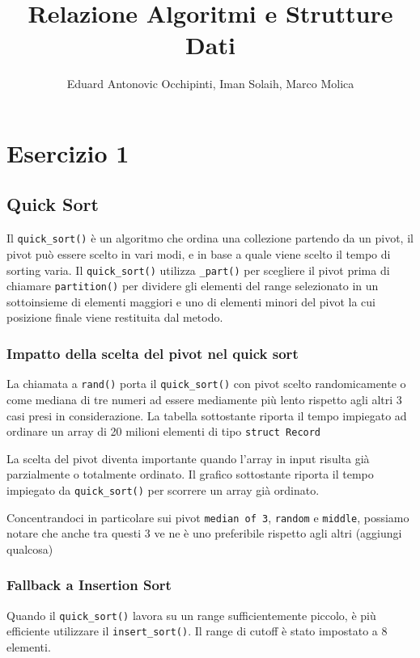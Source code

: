 \documentclass[12pt, letterpaper]{report}
\title{Relazione Algoritmi e Strutture Dati}
\author{Eduard Antonovic Occhipinti, Iman Solaih, Marco Molica}
\begin{document}
\maketitle
\tableofcontents

\chapter*{Esercizio 1}
\section{Quick Sort}
Il \verb|quick_sort()| è un algoritmo che ordina una collezione partendo da un pivot, 
il pivot può essere scelto in vari modi, e in base a quale viene scelto il tempo
di sorting varia. Il \verb|quick_sort()| utilizza \verb|_part()| per scegliere il pivot prima 
di chiamare \verb|partition()| per dividere gli elementi del range selezionato 
in un sottoinsieme di elementi maggiori e uno di elementi minori del pivot
la cui posizione finale viene restituita dal metodo.

\subsection{Impatto della scelta del pivot nel quick sort}
La chiamata a \verb|rand()| porta il \verb|quick_sort()| con pivot scelto 
randomicamente o come mediana di tre numeri ad essere mediamente più lento 
rispetto agli altri 3 casi presi in considerazione. La tabella sottostante 
riporta il tempo impiegato ad ordinare un array di 20 milioni elementi di tipo \verb|struct Record|


La scelta del pivot diventa importante quando l'array in input risulta già
parzialmente o totalmente ordinato.
Il grafico sottostante riporta il tempo impiegato da \verb|quick_sort()| 
per scorrere un array già ordinato.



Concentrandoci in particolare sui pivot \verb|median of 3|, \verb|random| e \verb|middle|, 
possiamo notare che anche tra questi 3 ve ne è uno preferibile rispetto agli altri (aggiungi qualcosa)


\subsection{Fallback a Insertion Sort}
Quando il \verb|quick_sort()| lavora su un range sufficientemente piccolo, è più
efficiente utilizzare il \verb|insert_sort()|. Il range di cutoff è stato impostato a 8 elementi.
\end{document}
